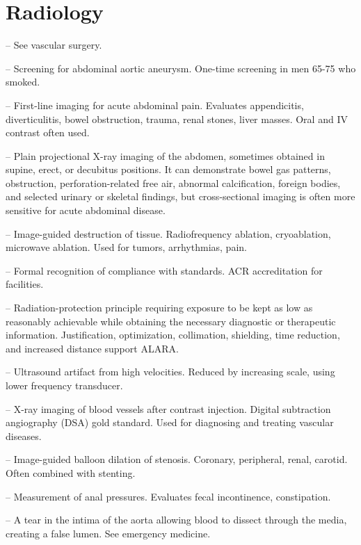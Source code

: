 \chapter{Radiology}

-- See vascular surgery.

-- Screening for abdominal aortic aneurysm. One-time screening in men 65-75 who smoked.

-- First-line imaging for acute abdominal pain. Evaluates appendicitis, diverticulitis, bowel obstruction, trauma, renal stones, liver masses. Oral and IV contrast often used.

-- Plain projectional X-ray imaging of the abdomen, sometimes obtained in supine, erect, or decubitus positions. It can demonstrate bowel gas patterns, obstruction, perforation-related free air, abnormal calcification, foreign bodies, and selected urinary or skeletal findings, but cross-sectional imaging is often more sensitive for acute abdominal disease.

-- Image-guided destruction of tissue. Radiofrequency ablation, cryoablation, microwave ablation. Used for tumors, arrhythmias, pain.

-- Formal recognition of compliance with standards. ACR accreditation for facilities.

-- Radiation-protection principle requiring exposure to be kept as low as reasonably achievable while obtaining the necessary diagnostic or therapeutic information. Justification, optimization, collimation, shielding, time reduction, and increased distance support ALARA.

-- Ultrasound artifact from high velocities. Reduced by increasing scale, using lower frequency transducer.

-- X-ray imaging of blood vessels after contrast injection. Digital subtraction angiography (DSA) gold standard. Used for diagnosing and treating vascular diseases.

-- Image-guided balloon dilation of stenosis. Coronary, peripheral, renal, carotid. Often combined with stenting.

-- Measurement of anal pressures. Evaluates fecal incontinence, constipation.

-- A tear in the intima of the aorta allowing blood to dissect through the media, creating a false lumen. See emergency medicine.

